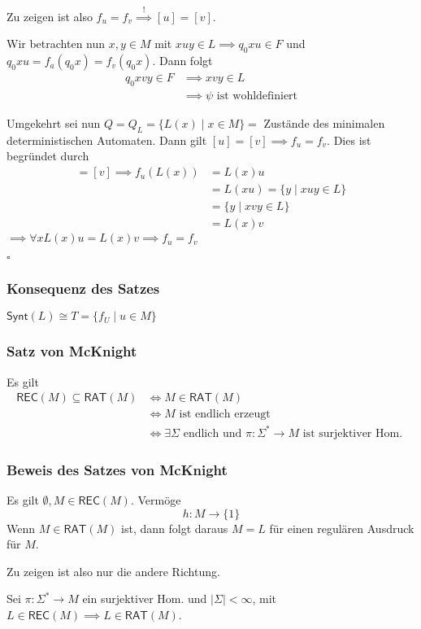 \documentclass[12pt, german]{article}
\newcommand{\sigstern}{\Sigma^\ast}
\newcommand{\rat}{\mathsf{RAT}}
\newcommand{\rec}{\mathsf{REC}}
\newcommand{\synt}{\mathsf{Synt}}
\newcommand{\bewiesen}{
	
	\begin{flushright}
		$\square$  \\
\end{flushright}}
\begin{document}
	Zu zeigen ist also $f_u = f_v \overset{!}{\implies} [u] = [v]$. 
	
	Wir betrachten nun $x, y \in M$ mit $xuy \in L \implies q_0xu \in F$ und $q_0xu = f_a(q_0x) = f_v(q_0x)$. Dann folgt
	\begin{align*}
		q_0xvy \in F &\implies xvy \in L\\
		&\implies \psi \text{ ist wohldefiniert}
	\end{align*}
	
	Umgekehrt sei nun $Q = Q_L = \{L(x) \mid x \in M\} =$ Zustände des minimalen deterministischen Automaten. Dann gilt $[u]= [v] \implies f_u = f_v$. Dies ist begründet durch
	\begin{align*}
		[u]= [ v ] \implies f_u(L(x)) &= L(x)u \\
		&= L(xu) = \{y \mid xuy \in L\} \\ 
		&= \{y \mid xvy \in L\} \\
		&= L(x)v 
	\end{align*}
	$\implies \forall x L(x)u = L(x)v \implies f_u = f_v$
	\bewiesen
	
	\subsubsection{Konsequenz des Satzes}
	$\synt(L) \cong T = \{f_U \mid u \in M\}$
	
	\subsubsection{Satz von McKnight}
	Es gilt 
	\begin{align*}
		\rec(M) \subseteq \rat(M) &\iff M \in \rat(M)\\ 
		&\iff M \text{ ist endlich erzeugt} \\ 
		&\iff \exists \Sigma \text{ endlich und } \pi : \sigstern \to M \text{ ist surjektiver Hom. }
	\end{align*}
	
	\subsubsection{Beweis des Satzes von McKnight}
	Es gilt $\emptyset, M \in \rec(M)$. Vermöge $$h: M \to \{1\}$$ Wenn $M \in \rat(M)$ ist, dann folgt daraus $M=L$ für einen regulären Ausdruck für $M$. 
	
	Zu zeigen ist also nur die andere Richtung. 
	\newline
	
	Sei $\pi : \sigstern \to M$ ein surjektiver Hom. und $|\Sigma| < \infty$, mit $L \in \rec(M) \implies L \in \rat(M)$. 
	
\end{document}
